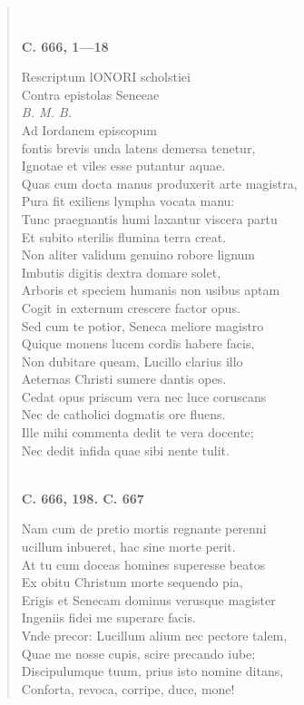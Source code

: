 \documentclass[11pt, a4paper]{report}
\begin{document}
\begin{verse}
        ﻿\pagebreak 
    \begin{center} \textbf{C. 666, 1—18} \end{center} \marginpar{[137]} Rescriptum lONORI scholstiei \\ Contra epistolas Seneeae \\ \textit{B. M. B.} \\ Ad Iordanem episcopum \\ fontis brevis unda latens demersa tenetur, \\ Ignotae et viles esse putantur aquae. \\ Quas cum docta manus produxerit arte magistra, \\ Pura fit exiliens lympha vocata manu: \\ Tunc praegnantis humi laxantur viscera partu \\ Et subito sterilis flumina terra creat. \\ Non aliter validum genuino robore lignum \\ Imbutis digitis dextra domare solet, \\ Arboris et speciem humanis non usibus aptam \\ Cogit in externum crescere factor opus. \\ Sed cum te potior, Seneca meliore magistro \\ Quique monens lucem cordis habere facis, \\ Non dubitare queam, Lucillo clarius illo \\ Aeternas Christi sumere dantis opes. \\ Cedat opus priscum vera nec luce coruscans \\ Nec de catholici dogmatis ore fluens. \\ Ille mihi commenta dedit te vera docente; \\ Nec dedit infida quae sibi nente tulit. \\ 
        ﻿\pagebreak 
     \marginpar{[138]} \begin{center} \textbf{C. 666, 198. C. 667} \end{center}Nam cum de pretio mortis regnante perenni \\ ucillum inbueret, hac sine morte perit. \\ At tu cum doceas homines superesse beatos \\ Ex obitu Christum morte sequendo pia, \\ Erigis et Senecam dominus verusque magister \\ Ingeniis fidei me superare facis. \\ Vnde precor: Lucillum alium nec pectore talem, \\ Quae me nosse cupis, scire precando iube; \\ Discipulumque tuum, prius isto nomine ditans, \\ Conforta, revoca, corripe, duce, mone! \\ 
      \end{verse}
  
\end{document}
